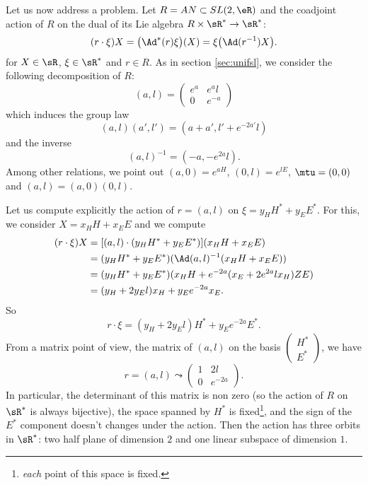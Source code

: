 Let us now address a problem. Let $R=AN\subset SL(2,\eR)$ and the coadjoint action of $R$ on the dual of its Lie algebra $R\times\sR^*\to\sR^*$:
\begin{equation}
(r\cdot \xi)X=\big( \Ad^*(r)\xi \big)(X)=\xi\big( \Ad(r^{-1})X \big).
\end{equation}
for $X\in\sR$, $\xi\in\sR^*$ and $r\in R$. As in section \ref{sec:unifsl}, we consider the following decomposition of $R$:
\begin{equation}  \label{eq:defeaeal}
(a,l)=
\begin{pmatrix}
e^a & e^al\\
0 & e^{-a}
\end{pmatrix}
\end{equation}
which induces the group law
\begin{equation}
  (a,l)(a',l')=(a+a',l'+e^{-2a'}l)
\end{equation}
and the inverse
\begin{equation}
  (a,l)^{-1}=(-a,-e^{2a}l).
\end{equation}
Among other relations, we point out $(a,0)=e^{aH}$, $(0,l)=e^{lE}$, $\mtu=(0,0)$ and $(a,l)=(a,0)(0,l)$.

Let us compute explicitly the action of $r=(a,l)$ on $\xi=y_H H^*+y_EE^*$. For this, we consider $X=x_H H+x_EE$ and we compute
\begin{equation}
\begin{split}
  (r\cdot \xi)X&=[(a,l)\cdot (y_HH^*+y_EE^*)](x_HH+x_EE)\\
		&=(y_HH^*+y_EE^*)(\Ad(a,l)^{-1} (x_HH+x_EE) )\\
		&=(y_HH^*+y_EE^*)(x_HH+e^{-2a}(x_E+2e^{2a}lx_H)ZE)\\
		&=(y_H+2y_El)x_H+y_E e^{-2a}x_E.
\end{split}
\end{equation}
So
\begin{equation}
  r\cdot \xi=(y_H+2y_El)H^*+y_Ee^{-2a}E^*.
\end{equation}
From a matrix point of view, the matrix of $(a,l)$ on the basis
$\begin{pmatrix}
H^*\\
E^*
\end{pmatrix}
$, we have
\[ 
  r=(a,l)\leadsto
\begin{pmatrix}
1&2l\\0&e^{-2a}
\end{pmatrix}.
\]
In particular, the determinant of this matrix is non zero (so the action of $R$ on $\sR^*$ is always bijective), the space spanned by $H^*$ is fixed\footnote{\emph{each} point of this space is fixed.}, and the sign of the $E^*$ component doesn't changes under the action. Then the action has three orbits in $\sR^*$: two half plane of dimension $2$ and one linear subspace of dimension $1$.


